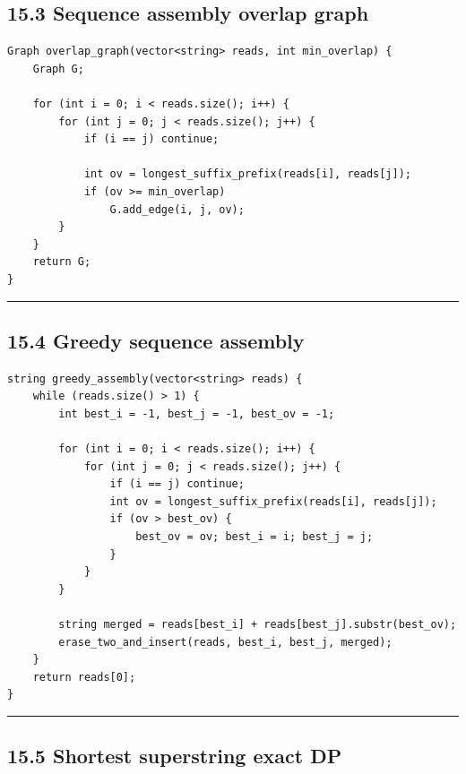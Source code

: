\documentclass[11pt]{article}
\begin{document}
\subsection{15.3 Sequence assembly overlap graph}\label{sequence-assembly-overlap-graph}

\begin{verbatim}
Graph overlap_graph(vector<string> reads, int min_overlap) {
    Graph G;

    for (int i = 0; i < reads.size(); i++) {
        for (int j = 0; j < reads.size(); j++) {
            if (i == j) continue;

            int ov = longest_suffix_prefix(reads[i], reads[j]);
            if (ov >= min_overlap)
                G.add_edge(i, j, ov);
        }
    }
    return G;
}
\end{verbatim}

\begin{center}\rule{0.5\linewidth}{0.5pt}\end{center}

\subsection{15.4 Greedy sequence assembly}\label{greedy-sequence-assembly}

\begin{verbatim}
string greedy_assembly(vector<string> reads) {
    while (reads.size() > 1) {
        int best_i = -1, best_j = -1, best_ov = -1;

        for (int i = 0; i < reads.size(); i++) {
            for (int j = 0; j < reads.size(); j++) {
                if (i == j) continue;
                int ov = longest_suffix_prefix(reads[i], reads[j]);
                if (ov > best_ov) {
                    best_ov = ov; best_i = i; best_j = j;
                }
            }
        }

        string merged = reads[best_i] + reads[best_j].substr(best_ov);
        erase_two_and_insert(reads, best_i, best_j, merged);
    }
    return reads[0];
}
\end{verbatim}

\begin{center}\rule{0.5\linewidth}{0.5pt}\end{center}

\subsection{15.5 Shortest superstring exact DP}\label{shortest-superstring-exact-dp}
\end{document}
